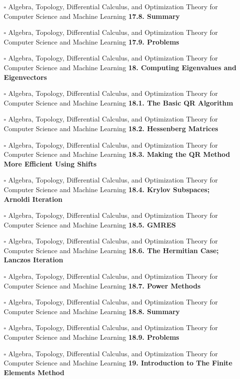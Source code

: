\documentclass[a4, landscape, 12pt]{article}
\newcommand{\checkbox}{$\square$}%
\begin{document}
\begin{itemize}
\item [\checkbox]  Algebra, Topology, Differential Calculus, and Optimization Theory for Computer Science and Machine Learning \textbf{ 17.8. Summary
}
\item [\checkbox]  Algebra, Topology, Differential Calculus, and Optimization Theory for Computer Science and Machine Learning \textbf{ 17.9. Problems
}
\item [\checkbox]  Algebra, Topology, Differential Calculus, and Optimization Theory for Computer Science and Machine Learning \textbf{ 18. Computing Eigenvalues and Eigenvectors
}
\item [\checkbox]  Algebra, Topology, Differential Calculus, and Optimization Theory for Computer Science and Machine Learning \textbf{ 18.1. The Basic QR Algorithm
}
\item [\checkbox]  Algebra, Topology, Differential Calculus, and Optimization Theory for Computer Science and Machine Learning \textbf{ 18.2. Hessenberg Matrices
}
\item [\checkbox]  Algebra, Topology, Differential Calculus, and Optimization Theory for Computer Science and Machine Learning \textbf{ 18.3. Making the QR Method More Efficient Using Shifts
}
\item [\checkbox]  Algebra, Topology, Differential Calculus, and Optimization Theory for Computer Science and Machine Learning \textbf{ 18.4. Krylov Subspaces; Arnoldi Iteration
}
\item [\checkbox]  Algebra, Topology, Differential Calculus, and Optimization Theory for Computer Science and Machine Learning \textbf{ 18.5. GMRES
}
\item [\checkbox]  Algebra, Topology, Differential Calculus, and Optimization Theory for Computer Science and Machine Learning \textbf{ 18.6. The Hermitian Case; Lanczos Iteration
}
\item [\checkbox]  Algebra, Topology, Differential Calculus, and Optimization Theory for Computer Science and Machine Learning \textbf{ 18.7. Power Methods
}
\item [\checkbox]  Algebra, Topology, Differential Calculus, and Optimization Theory for Computer Science and Machine Learning \textbf{ 18.8. Summary
}
\item [\checkbox]  Algebra, Topology, Differential Calculus, and Optimization Theory for Computer Science and Machine Learning \textbf{ 18.9. Problems
}
\item [\checkbox]  Algebra, Topology, Differential Calculus, and Optimization Theory for Computer Science and Machine Learning \textbf{ 19. Introduction to The Finite Elements Method
}
\end{itemize}
\end{document}
